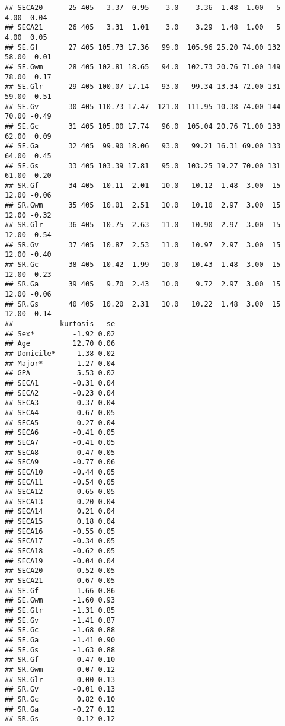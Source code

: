 \documentclass[
]{article}
\newenvironment{Shaded}{\begin{snugshade}}{\end{snugshade}}
\newcommand{\FunctionTok}[1]{\textcolor[rgb]{0.00,0.00,0.00}{#1}}
\newcommand{\NormalTok}[1]{#1}
\newcommand{\SpecialCharTok}[1]{\textcolor[rgb]{0.00,0.00,0.00}{#1}}
\begin{document}
\begin{verbatim}
## SECA20      25 405   3.37  0.95    3.0    3.36  1.48  1.00   5  4.00  0.04
## SECA21      26 405   3.31  1.01    3.0    3.29  1.48  1.00   5  4.00  0.05
## SE.Gf       27 405 105.73 17.36   99.0  105.96 25.20 74.00 132 58.00  0.01
## SE.Gwm      28 405 102.81 18.65   94.0  102.73 20.76 71.00 149 78.00  0.17
## SE.Glr      29 405 100.07 17.14   93.0   99.34 13.34 72.00 131 59.00  0.51
## SE.Gv       30 405 110.73 17.47  121.0  111.95 10.38 74.00 144 70.00 -0.49
## SE.Gc       31 405 105.00 17.74   96.0  105.04 20.76 71.00 133 62.00  0.09
## SE.Ga       32 405  99.90 18.06   93.0   99.21 16.31 69.00 133 64.00  0.45
## SE.Gs       33 405 103.39 17.81   95.0  103.25 19.27 70.00 131 61.00  0.20
## SR.Gf       34 405  10.11  2.01   10.0   10.12  1.48  3.00  15 12.00 -0.06
## SR.Gwm      35 405  10.01  2.51   10.0   10.10  2.97  3.00  15 12.00 -0.32
## SR.Glr      36 405  10.75  2.63   11.0   10.90  2.97  3.00  15 12.00 -0.54
## SR.Gv       37 405  10.87  2.53   11.0   10.97  2.97  3.00  15 12.00 -0.40
## SR.Gc       38 405  10.42  1.99   10.0   10.43  1.48  3.00  15 12.00 -0.23
## SR.Ga       39 405   9.70  2.43   10.0    9.72  2.97  3.00  15 12.00 -0.06
## SR.Gs       40 405  10.20  2.31   10.0   10.22  1.48  3.00  15 12.00 -0.14
##           kurtosis   se
## Sex*         -1.92 0.02
## Age          12.70 0.06
## Domicile*    -1.38 0.02
## Major*       -1.27 0.04
## GPA           5.53 0.02
## SECA1        -0.31 0.04
## SECA2        -0.23 0.04
## SECA3        -0.37 0.04
## SECA4        -0.67 0.05
## SECA5        -0.27 0.04
## SECA6        -0.41 0.05
## SECA7        -0.41 0.05
## SECA8        -0.47 0.05
## SECA9        -0.77 0.06
## SECA10       -0.44 0.05
## SECA11       -0.54 0.05
## SECA12       -0.65 0.05
## SECA13       -0.20 0.04
## SECA14        0.21 0.04
## SECA15        0.18 0.04
## SECA16       -0.55 0.05
## SECA17       -0.34 0.05
## SECA18       -0.62 0.05
## SECA19       -0.04 0.04
## SECA20       -0.52 0.05
## SECA21       -0.67 0.05
## SE.Gf        -1.66 0.86
## SE.Gwm       -1.60 0.93
## SE.Glr       -1.31 0.85
## SE.Gv        -1.41 0.87
## SE.Gc        -1.68 0.88
## SE.Ga        -1.41 0.90
## SE.Gs        -1.63 0.88
## SR.Gf         0.47 0.10
## SR.Gwm       -0.07 0.12
## SR.Glr        0.00 0.13
## SR.Gv        -0.01 0.13
## SR.Gc         0.82 0.10
## SR.Ga        -0.27 0.12
## SR.Gs         0.12 0.12
\end{verbatim}

\begin{Shaded}
\end{Shaded}
\end{document}
